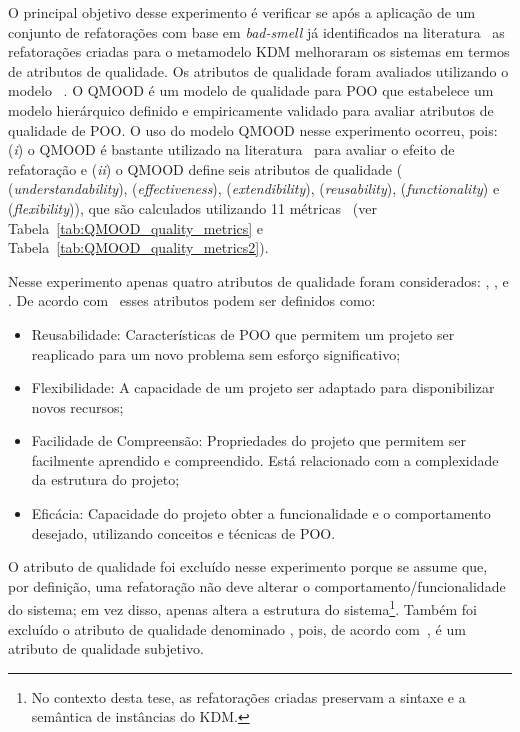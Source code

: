 O principal objetivo desse experimento é verificar se após a aplicação de um conjunto de refatorações com base em \textit{bad-smell} já identificados na literatura~\cite{Kessentini_2011, Ouni_2013, Moha_2010, Kessentini_2010} as refatorações criadas para o metamodelo KDM melhoraram os sistemas em termos de atributos de qualidade. Os atributos de qualidade foram avaliados utilizando o modelo ~\cite{Bansiya_QMOOD}. O QMOOD é um modelo de qualidade para POO que estabelece um modelo hierárquico definido e empiricamente validado para avaliar atributos de qualidade de POO. O uso do modelo QMOOD nesse experimento ocorreu, pois: (\textit{i}) o QMOOD é bastante utilizado na literatura~\cite{Keeffe_2008, Seng_2006, Jensen_2010} para avaliar o efeito de refatoração e (\textit{ii}) o QMOOD define seis atributos de qualidade ( (\textit{understandability}),  (\textit{effectiveness}),  (\textit{extendibility}),  (\textit{reusability}),  (\textit{functionality}) e  (\textit{flexibility})), que são calculados utilizando 11 métricas~\cite{Bansiya_QMOOD} (ver Tabela~\ref{tab:QMOOD_quality_metrics} e Tabela~\ref{tab:QMOOD_quality_metrics2}). 


Nesse experimento apenas quatro atributos de qualidade foram considerados: , ,  e . De acordo com~ esses atributos podem ser definidos como: 

\begin{itemize}
\item Reusabilidade: Características de POO que permitem um projeto ser reaplicado para um novo problema sem esforço significativo;
\item Flexibilidade: A capacidade de um projeto ser adaptado para disponibilizar novos recursos;
\item Facilidade de Compreensão: Propriedades do projeto que permitem ser facilmente aprendido e compreendido. Está relacionado com a complexidade da estrutura do projeto;
\item Eficácia: Capacidade do projeto obter a funcionalidade e o comportamento desejado, utilizando conceitos e técnicas de POO.
\end{itemize}

O atributo de qualidade  foi excluído nesse experimento porque se assume que, por definição, uma refatoração não deve alterar o comportamento/funcionalidade do sistema; em vez disso, apenas altera a estrutura do sistema\footnote{No contexto desta tese, as refatorações criadas preservam a sintaxe e a semântica de instâncias do KDM.}. Também foi excluído o atributo de qualidade denominado , pois, de acordo com~, é um atributo de qualidade subjetivo. 

